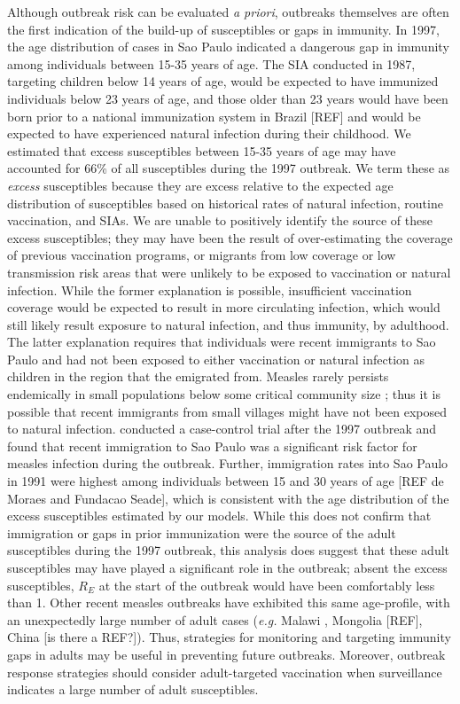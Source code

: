 Although outbreak risk can be evaluated \emph{a priori}, outbreaks themselves are often the first indication of the build-up of susceptibles or gaps in immunity. In 1997, the age distribution of cases in Sao Paulo indicated a dangerous gap in immunity among individuals between 15-35 years of
age. The SIA conducted in 1987, targeting children below 14 years of age, would be expected to have immunized individuals below 23 years of
age, and those older than 23 years would have been born prior to a national immunization system in Brazil {[}REF{]} and would be expected
to have experienced natural infection during their childhood. We estimated that excess susceptibles between 15-35 years of age may have accounted for 66\% of all susceptibles during the 1997 outbreak. We term these as \emph{excess} susceptibles because they are
excess relative to the expected age distribution of susceptibles based on historical rates of natural infection, routine vaccination, and SIAs. We are unable to positively identify the source of these excess susceptibles; they may have been the result of over-estimating the coverage of previous
vaccination programs, or migrants from low coverage or low transmission risk areas that were unlikely to be exposed to vaccination or natural infection. While the former explanation is possible, insufficient vaccination coverage would be expected to result in more circulating infection, which would still likely result exposure to natural infection, and thus immunity, by adulthood. The latter explanation requires that individuals were recent immigrants to Sao Paulo and had not been exposed to either vaccination or natural infection as children in the region that the emigrated from. Measles rarely persists endemically in small populations below some critical community size \cite{Conlan_2007, Keeling_1997}; thus it is possible that recent immigrants from small villages might have not been exposed to natural infection. \citet{Camargo_2000} conducted a case-control trial after the 1997 outbreak and found that recent immigration to Sao Paulo was a significant risk factor for measles infection during the outbreak. Further, immigration rates into Sao Paulo in 1991 were highest among individuals between 15 and 30 years of age  {[}REF de Moraes and Fundacao
Seade{]}, which is consistent with the age distribution of the excess susceptibles estimated by our models. While this does not confirm that
immigration or gaps in prior immunization were the source of the adult susceptibles during the 1997 outbreak, this analysis does suggest that
these adult susceptibles may have played a significant role in the outbreak; absent the excess susceptibles, $R_E$ at the start of the outbreak would have been comfortably less than 1. Other recent measles outbreaks have exhibited this same age-profile, with an unexpectedly large number of adult cases (\emph{e.g.} Malawi \cite{Minetti_2013}, Mongolia {[}REF{]}, China {[}is there a REF?{]}). Thus, strategies for monitoring and targeting immunity gaps in adults may be useful in preventing future outbreaks. Moreover, outbreak response strategies should consider adult-targeted vaccination when surveillance indicates a large number of adult susceptibles.

